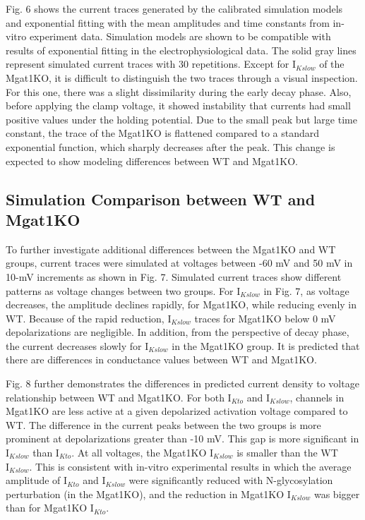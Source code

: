 \documentclass[10pt,letterpaper]{article}
\begin{document}
Fig. 6 shows the current traces generated by the calibrated simulation models and exponential fitting with the mean amplitudes and time constants from in-vitro experiment data. Simulation models are shown to be compatible with results of exponential fitting in the electrophysiological data. The solid gray lines represent simulated current traces with 30 repetitions. Except for $\text{I}_{Kslow}$ of the Mgat1KO, it is difficult to distinguish the two traces through a visual inspection. For this one, there was a slight dissimilarity during the early decay phase. Also, before applying the clamp voltage, it showed instability that currents had small positive values under the holding potential. Due to the small peak but large time constant, the trace of the Mgat1KO is flattened compared to a standard exponential function, which sharply decreases after the peak. This change is expected to show modeling differences between WT and Mgat1KO.

\subsection*{Simulation Comparison between WT and Mgat1KO}
To further investigate additional differences between the Mgat1KO and WT groups, current traces were simulated at voltages between -60 mV and 50 mV in 10-mV increments as shown in Fig. 7. Simulated current traces show different patterns as voltage changes between two groups. For $\text{I}_{Kslow}$ in Fig. 7, as voltage decreases, the amplitude declines rapidly, for Mgat1KO, while reducing evenly in WT. Because of the rapid reduction, $\text{I}_{Kslow}$ traces for Mgat1KO below 0 mV depolarizations are negligible. In addition, from the perspective of decay phase, the current decreases slowly for $\text{I}_{Kslow}$ in the Mgat1KO group. It is predicted that there are differences in conductance values between WT and Mgat1KO.

Fig. 8 further demonstrates the differences in predicted current density to voltage relationship between WT and Mgat1KO. For both $\text{I}_{Kto}$ and $\text{I}_{Kslow}$, channels in Mgat1KO are less active at a given depolarized activation voltage compared to WT. The difference in the current peaks between the two groups is more prominent at depolarizations greater than -10 mV. This gap is more significant in $\text{I}_{Kslow}$ than $\text{I}_{Kto}$. At all voltages, the Mgat1KO $\text{I}_{Kslow}$ is smaller than the WT $\text{I}_{Kslow}$. This is consistent with in-vitro experimental results in which the average amplitude of $\text{I}_{Kto}$ and $\text{I}_{Kslow}$ were significantly reduced with N-glycosylation perturbation (in the Mgat1KO), and the reduction in Mgat1KO $\text{I}_{Kslow}$ was bigger than for Mgat1KO $\text{I}_{Kto}$. 
\end{document}
